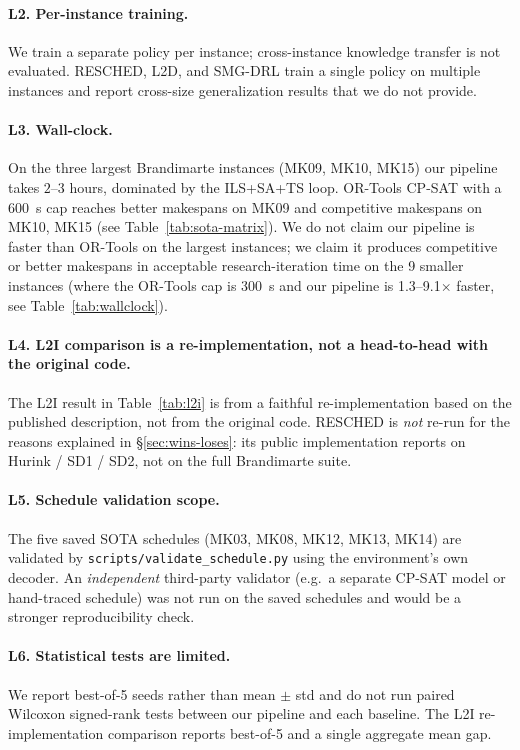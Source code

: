\documentclass[10pt]{article}
\theoremstyle{definition}
\newcommand{\eg}{e.g.\!}
\begin{document}
\paragraph{L2. Per-instance training.}
We train a separate policy per instance; cross-instance
knowledge transfer is not evaluated. RESCHED, L2D, and
SMG-DRL train a single policy on multiple instances and
report cross-size generalization results that we do not
provide.

\paragraph{L3. Wall-clock.}
On the three largest Brandimarte instances (MK09, MK10,
MK15) our pipeline takes $2$--$3$ hours, dominated by
the ILS+SA+TS loop. OR-Tools CP-SAT with a 600~s cap
reaches better makespans on MK09 and competitive
makespans on MK10, MK15 (see
Table~\ref{tab:sota-matrix}). We do not claim our
pipeline is faster than OR-Tools on the largest
instances; we claim it produces competitive or better
makespans in acceptable research-iteration time on the
9 smaller instances (where the OR-Tools cap is 300~s
and our pipeline is 1.3--9.1$\times$ faster, see
Table~\ref{tab:wallclock}).

\paragraph{L4. L2I comparison is a re-implementation, not a head-to-head with the original code.}
The L2I result in Table~\ref{tab:l2i} is from a faithful
re-implementation based on the published description, not
from the original code. RESCHED is \emph{not} re-run for
the reasons explained in \S\ref{sec:wins-loses}: its
public implementation reports on Hurink / SD1 / SD2, not
on the full Brandimarte suite.

\paragraph{L5. Schedule validation scope.}
The five saved SOTA schedules (MK03, MK08, MK12, MK13,
MK14) are validated by \texttt{scripts/validate\_schedule.py}
using the environment's own decoder. An \emph{independent}
third-party validator (\eg\ a separate CP-SAT model or
hand-traced schedule) was not run on the saved schedules
and would be a stronger reproducibility check.

\paragraph{L6. Statistical tests are limited.}
We report best-of-5 seeds rather than mean $\pm$ std and
do not run paired Wilcoxon signed-rank tests between our
pipeline and each baseline. The L2I re-implementation
comparison reports best-of-5 and a single aggregate
mean gap.
\end{document}
